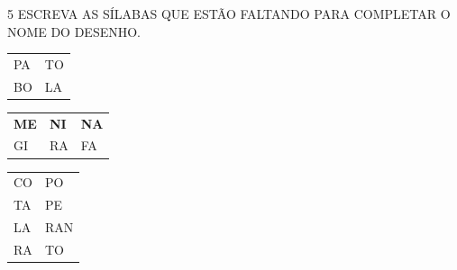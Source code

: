 \begin{escola}


\num{5} ESCREVA AS SÍLABAS QUE ESTÃO FALTANDO PARA COMPLETAR O NOME DO DESENHO.




\begin{longtable}[]{@{}ll@{}}
\toprule
PA & TO\tabularnewline
BO & LA\tabularnewline
\bottomrule
\end{longtable}

\begin{longtable}[]{@{}lll@{}}
\toprule
\textbf{ME} & \textbf{NI} & \textbf{NA}\tabularnewline
GI & RA & FA\tabularnewline
\bottomrule
\end{longtable}


\begin{longtable}[]{@{}ll@{}}
\toprule
CO & PO\tabularnewline
TA & PE\tabularnewline
LA & RAN\tabularnewline
RA & TO\tabularnewline
\bottomrule
\end{longtable}





\end{escola}
